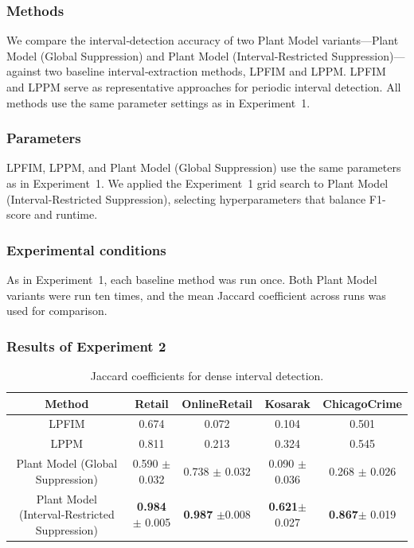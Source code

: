 \subsubsection{Methods}
We compare the interval‑detection accuracy of two Plant Model variants—Plant Model (Global Suppression) and Plant Model (Interval‑Restricted Suppression)—against two baseline interval‑extraction methods, LPFIM and LPPM. LPFIM and LPPM serve as representative approaches for periodic interval detection. All methods use the same parameter settings as in Experiment 1.

\subsubsection{Parameters}
LPFIM, LPPM, and Plant Model (Global Suppression) use the same parameters as in Experiment 1.  
We applied the Experiment 1 grid search to Plant Model (Interval‑Restricted Suppression), selecting hyperparameters that balance F1-score and runtime.

\subsubsection{Experimental conditions}
As in Experiment 1, each baseline method was run once. Both Plant Model variants were run ten times, and the mean Jaccard coefficient across runs was used for comparison. 


\subsubsection{Results of Experiment 2}

\begin{table}[t]
  \centering
  \caption{Jaccard coefficients for dense interval detection. }
  \label{tab:jaccard_scores}
  \begin{tabular}{|c|cccc|}
    \hline
    Method & Retail & OnlineRetail & Kosarak & ChicagoCrime \\
    \hline
    LPFIM                                    & 0.674 & 0.072 & 0.104 & 0.501 \\
    LPPM                                     & 0.811 & 0.213 & 0.324 & 0.545 \\
    Plant Model (Global Suppression)                        &  0.590 $\pm$ 0.032 & 0.738 $\pm$ 0.032& 0.090 $\pm$0.036 & 0.268 $\pm$ 0.026 \\
    Plant Model (Interval‑Restricted Suppression)                       & \textbf{0.984} $\pm$ 0.005& \textbf{0.987} $\pm$0.008& \textbf{0.621}$\pm$ 0.027& \textbf{0.867}$\pm$ 0.019\\
    \hline
  \end{tabular}
\end{table}


